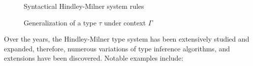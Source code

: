 \begin{figure}[H]
  \caption[Syntactical Hindley-Milner system rules]{Syntactical Hindley-Milner system rules \cite{Clement1986_MiniML}}
  \label{fig:syntactical-hm-rules}
\end{figure}

\begin{figure}[H]
  \caption{Generalization of a type $\tau$ under context $\Gamma$}
  \label{fig:generalization-def}
\end{figure}

Over the years, the Hindley-Milner type system has been extensively studied and expanded, therefore, numerous variations of type inference algorithms, and extensions have been discovered. Notable examples include:

